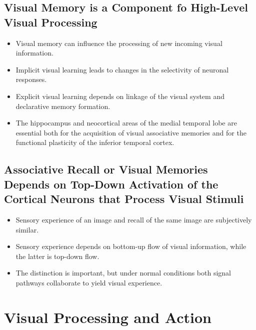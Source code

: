 \documentclass[12pt,a4paper]{article}
\begin{document}
\subsection{Visual Memory is a Component fo High-Level Visual Processing}
\begin{itemize}
    \item Visual memory can influence the processing of new incoming visual information.
    \item Implicit visual learning leads to changes in the selectivity of neuronal responses.
    \item Explicit visual learning depends on linkage of the visual system and declarative memory formation.
    \item The hippocampus and neocortical areas of the medial temporal lobe are essential both for the acquisition of visual associative memories and for the functional plasticity of the inferior temporal cortex. 
\end{itemize}

\subsection{Associative Recall or Visual Memories Depends on Top-Down Activation of the Cortical Neurons that Process Visual Stimuli}
\begin{itemize}
    \item Sensory experience of an image and recall of the same image are subjectively similar. 
    \item Sensory experience depends on bottom-up flow of visual information, while the latter is top-down flow. 
    \item The distinction is important, but under normal conditions both signal pathways collaborate to yield visual experience.
\end{itemize}

\clearpage
\section{Visual Processing and Action}
\end{document}
